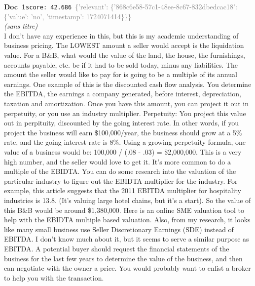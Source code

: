 \documentclass[a4paper,11pt]{article}
\begin{document}
\begin{docenv}
{\footnotesize\textcolor{doccolor}{\textbf{Doc~1}}}\hfill{\tiny\texttt{score:~42.686}}\ {\tiny\textcolor{gray}{\{'relevant': \{'868c6e58-57c1-48ee-8c67-832dbedcac18': \{'value': 'no', 'timestamp': 1724071414\}\}\}}}\\[3pt]
{\small\textit{(sans titre)}}\\[2pt]
\vspace{2pt}
{\footnotesize 
I don't have any experience in this, but this is my academic understanding of business pricing.  The LOWEST amount a seller would accept is the liquidation value. For a B\&B, what would the value of the land, the house, the furnishings, accounts payable, etc. be if it had to be sold today, minus any liabilities.  The amount the seller would like to pay for is going to be a multiple of its annual earnings. One example of this is the discounted cash flow analysis. You determine the EBITDA, the earnings a company generated, before interest,  depreciation, taxation and amortization.  Once you have this amount, you can project it out in perpetuity, or you use an industry multiplier.  Perpetuity:  You project this value out in perpituity, discounted by the going interest rate. In other words, if you project the business will earn \$100,000/year, the business should grow at a 5\% rate, and the going interest rate is 8\%. Using a growing perpetuity formula, one value of a business would be: 100,000 / (.08 - .03) = \$2,000,000.  This is a very high number, and the seller would love to get it.  It's more common to do a multiple of the EBIDTA. You can do some research into the valuation of the particular industry to figure out the EBIDTA multiplier for the industry. For example, this article suggests that the 2011 EBITDA multiplier for hospitality industries is 13.8. (It's valuing large hotel chains, but it's a start). So the value of this B\&B would be around \$1,380,000. Here is an online SME valuation tool to help with the EBIDTA multiple based valuation. Also, from my research, it looks like many small business use Seller Discretionary Earnings  (SDE) instead of EBITDA. I don't know much about it, but it seems to serve a similar purpose as EBITDA.  A potential buyer should request the financial statements of the business for the last few years to determine the value of the business, and then can negotiate with the owner a price. You would probably want to enlist a broker to help you with the transaction.}
\end{docenv}
\end{document}
